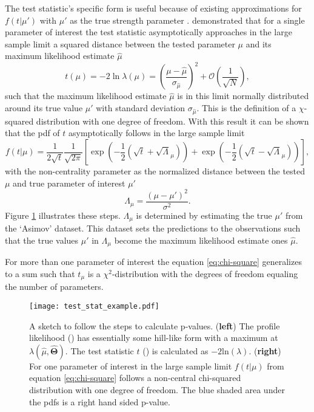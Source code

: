The test statistic's specific form is useful because of existing approximations for $f(t | \mu')$ with $\mu'$ as the true strength parameter \citep{cowan2011asymptotic}.
\citet{wald1943tests} demonstrated that for a single parameter of interest the test statistic asymptotically approaches in the large sample limit a squared distance between the tested parameter $\mu$ and its maximum likelihood estimate $\hat{\mu}$
\begin{equation}
    t(\mu)=-2\ln \lambda(\mu)=
    \left(\frac{\mu-\hat{\mu}}{\sigma_{\hat{\mu}}} \right)^2
    + \mathcal{O}(\frac{1}{\sqrt{N}}),
\end{equation}
such that the maximum likelihood estimate $\hat{\mu}$ is in this limit normally distributed around its true value $\mu'$ with standard deviation $\sigma_{\hat{\mu}}$. This is the definition of a $\chi$-squared distribution with one degree of freedom. With this result it can be shown that \citep{cowan2011asymptotic} the \ac{pdf} of $t$ asymptotically follows in the large sample limit
\begin{equation}\label{eq:chi-square}
    f(t | \mu)=\frac{1}{2\sqrt{t}}\frac{1}{\sqrt{2\pi}}
    \left[
        \exp\left(-\frac{1}{2}\left(\sqrt{t}+\sqrt{\Lambda}_\mu\right)\right)
        +
        \exp\left(-\frac{1}{2}\left(\sqrt{t}-\sqrt{\Lambda}_\mu\right)\right)
        \right],
\end{equation}
with the non-centrality parameter as the normalized distance between the tested $\mu$ and true parameter of interest $\mu'$
\begin{equation}
    \Lambda_\mu=\frac{(\mu-\mu')^2}{\sigma^2}.
\end{equation}
Figure \ref{fig:test_stat_example} illustrates these steps. $\Lambda_\mu$ is determined by estimating the true $\mu'$ from the `Asimov' dataset. This dataset sets the predictions to the observations such that the true values $\mu'$ in $\Lambda_\mu$ become the maximum likelihood estimate ones $\hat{\mu}$.

For more than one parameter of interest the equation \ref{eq:chi-square} generalizes to a sum such that $t_\mu$ is a $\chi^2$-distribution with the degrees of freedom equaling the number of parameters.


\begin{figure}
    \centering
    \texttt{[image: test\_stat\_example.pdf]}
    \caption[]{A sketch to follow the steps to calculate p-values. (\textbf{left}) The profile likelihood ({\color[HTML]{1f77b4}{$\bm{\diagup}$}}) has essentially some hill-like form with a maximum at ${\lambda(\hat{\mu},\hat{\bm{\Theta}})}$. The test statistic $t$ ({\color[HTML]{ff7f0e}{$\bm{\diagup}$}}) is calculated as $-2\mathrm{ln}(\lambda)$. (\textbf{right}) For one parameter of interest in the large sample limit $f(t | \mu)$ from equation \ref{eq:chi-square} follows a non-central chi-squared distribution with one degree of freedom. The blue shaded area under the \acp{pdf} is a right hand sided p-value.}
    \label{fig:test_stat_example}
\end{figure}

